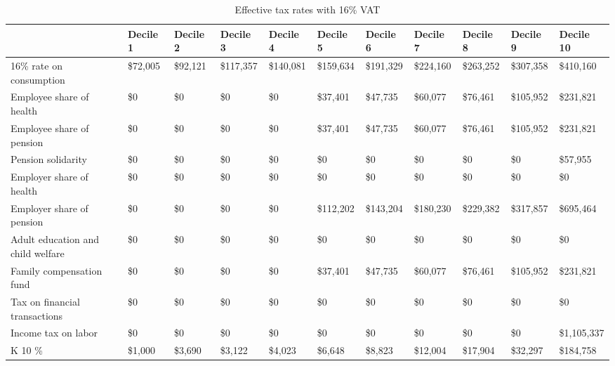 \documentclass[12pt]{article}
\begin{document}
\begin{landscape}
\begin{table}[]
\caption{Effective tax rates with 16\% VAT}
\label{tab:t16}
\footnotesize
\begin{tabular}{lllllllllll} \hline
 &Decile 1                          & Decile 2  & Decile 3  & Decile 4  & Decile 5    & Decile 6    & Decile 7    & Decile 8    & Decile 9    & Decile 10          \\ \hline
16\% rate on consumption          & \$72,005  & \$92,121  & \$117,357 & \$140,081   & \$159,634   & \$191,329   & \$224,160   & \$263,252   & \$307,358   & \$410,160    \\
Employee share of health          & \$0       & \$0       & \$0       & \$0         & \$37,401    & \$47,735    & \$60,077    & \$76,461    & \$105,952   & \$231,821    \\
Employee share of pension         & \$0       & \$0       & \$0       & \$0         & \$37,401    & \$47,735    & \$60,077    & \$76,461    & \$105,952   & \$231,821    \\
Pension solidarity                & \$0       & \$0       & \$0       & \$0         & \$0         & \$0         & \$0         & \$0         & \$0         & \$57,955     \\
Employer share of health          & \$0       & \$0       & \$0       & \$0         & \$0         & \$0         & \$0         & \$0         & \$0         & \$0          \\
Employer share of pension         & \$0       & \$0       & \$0       & \$0         & \$112,202   & \$143,204   & \$180,230   & \$229,382   & \$317,857   & \$695,464    \\
Adult education and child welfare & \$0       & \$0       & \$0       & \$0         & \$0         & \$0         & \$0         & \$0         & \$0         & \$0          \\
Family compensation fund          & \$0       & \$0       & \$0       & \$0         & \$37,401    & \$47,735    & \$60,077    & \$76,461    & \$105,952   & \$231,821    \\
Tax on financial transactions     & \$0       & \$0       & \$0       & \$0         & \$0         & \$0         & \$0         & \$0         & \$0         & \$0          \\
Income tax on labor               & \$0       & \$0       & \$0       & \$0         & \$0         & \$0         & \$0         & \$0         & \$0         & \$1,105,337  \\
K 10 \%                           & \$1,000   & \$3,690   & \$3,122   & \$4,023     & \$6,648     & \$8,823     & \$12,004    & \$17,904    & \$32,297    & \$184,758    \\

\end{tabular}
\end{table}
\end{landscape}
\end{document}

